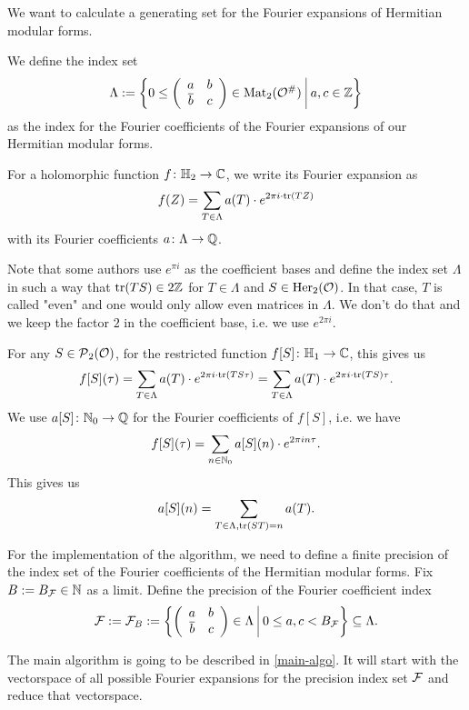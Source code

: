 \begin{prelim}
We want to calculate a generating set for the Fourier expansions of Hermitian modular forms.

We define the index set
\[ \Lambda := \Set{0 \le \SimpleMatrix{a}{b}{\overline b}{c} \in \M_2(\curlO^\#)}{a,c \in \Z } \]
as the index for the Fourier coefficients of the Fourier expansions of our Hermitian modular forms.

For a holomorphic function $f \colon \mathbb{H}_2 \rightarrow \mathbb{C}$, we write its Fourier expansion as
\[ f(Z) = \sum_{T \in \Lambda} a(T) \cdot e^{2 \pi i \cdot \textup{\textrm{tr}}(T Z)} \]
with its Fourier coefficients $a \colon \Lambda \rightarrow \mathbb{Q}$.

Note that some authors use $e^{\pi i}$ as the coefficient bases and define the index set $\Lambda$ in such a way that $\textup{\textrm{tr}}(TS) \in 2\mathbb{Z}$ for $T \in \Lambda$ and $S \in \operatorname{Her}_2(\mathcal{O})$. In that case, $T$ is called "even" and one would only allow even matrices in $\Lambda$. We don't do that and we keep the factor $2$ in the coefficient base, i.e. we use $e^{2 \pi i}$.
\end{prelim}

\begin{remark}
\label{remark:restricted-by-S}
For any $S \in \operatorname{\mathcal{P}}_2(\mathcal{O})$, for the restricted function $f[S] \colon \mathbb{H}_1 \rightarrow \mathbb{C}$, this gives us
\[ f[S](\tau) = \sum_{T \in \Lambda} a(T) \cdot e^{2 \pi i \cdot \textup{\textrm{tr}}(T S \tau)}
= \sum_{T \in \Lambda} a(T) \cdot e^{2 \pi i \cdot \textup{\textrm{tr}}(T S) \tau} . \]
We use $a[S] \colon \mathbb{N}_0 \rightarrow \mathbb{Q}$ for the Fourier coefficients of $f[S]$, i.e. we have
\[ f[S](\tau) = \sum_{n \in \mathbb{N}_0} a[S](n) \cdot e^{2 \pi i n \tau} . \]
This gives us
\[ a[S] (n) = \sum_{T \in \Lambda, \textup{\textrm{tr}}(S T) = n} a(T) . \]
\endproof
\end{remark}

For the implementation of the algorithm, we need to define a finite precision of the index set of the Fourier coefficients of the Hermitian modular forms.
Fix $B := B_{\mathcal{F}} \in \mathbb{N}$ as a limit. Define the precision of the Fourier coefficient index
\[ \F := \F_B := \Set{\SimpleMatrix{a}{b}{\overline b}{c} \in \Lambda}{0 \le a , c < B_{\F}} \subseteq \Lambda . \]

The main algorithm is going to be described in \cref{main-algo}. It will start with the vectorspace of all possible Fourier expansions for the precision index set $\mathcal{F}$ and reduce that vectorspace.

